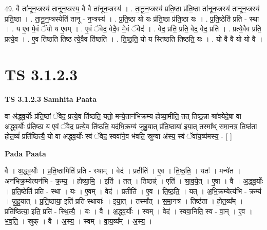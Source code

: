 \documentclass[17pt]{extarticle}
\begin{document}
49. वै ता॑नून॒प्त्रस्य॑ तानून॒प्त्रस्य॒ वै वै ता॑नून॒प्त्रस्य॑ । . ता॒नू॒न॒प्त्रस्य॑ प्रति॒ष्ठा प्र॑ति॒ष्ठा ता॑नून॒प्त्रस्य॑ तानून॒प्त्रस्य॑ प्रति॒ष्ठा । . ता॒नू॒न॒प्त्रस्येति॑ तानू - न॒प्त्रस्य॑ । . प्र॒ति॒ष्ठा यो यः प्र॑ति॒ष्ठा प्र॑ति॒ष्ठा यः । . प्र॒ति॒ष्ठेति॑ प्रति - स्था । . य ए॒व मे॒वं ॅयो य ए॒वम् । . ए॒वं ॅवेद॒ वेदै॒व मे॒वं ॅवेद॑ । . वेद॒ प्रति॒ प्रति॒ वेद॒ वेद॒ प्रति॑ । . प्रत्ये॒वैव प्रति॒ प्रत्ये॒व । . ए॒व ति॑ष्ठति तिष्ठ त्ये॒वैव ति॑ष्ठति । . ति॒ष्ठ॒ति॒ यो य स्ति॑ष्ठति तिष्ठति॒ यः । . यो वै वै यो यो वै । \newline
\pagebreak
{}

\section{ TS 3.1.2.3 }

\textbf{TS 3.1.2.3 } \newline
\textbf{Samhita Paata} \newline

वा अ॑द्ध्व॒र्योः प्र॑ति॒ष्ठां ॅवेद॒ प्रत्ये॒व ति॑ष्ठति॒ यतो॒ मन्ये॒तान॑भिक्रम्य होष्या॒मीति॒ तत् तिष्ठ॒न्ना श्रा॑वयेदे॒षा वा अ॑द्ध्व॒र्योः प्र॑ति॒ष्ठा य ए॒वं ॅवेद॒ प्रत्ये॒व ति॑ष्ठति॒ यद॑भि॒क्रम्य॑ जुहु॒यात् प्र॑ति॒ष्ठाया॑ इया॒त् तस्मा᳚थ् समा॒नत्र॒ तिष्ठ॑ता होत॒व्यं॑ प्रति॑ष्ठित्यै॒ यो वा अ॑द्ध्व॒र्योः स्वं ॅवेद॒ स्ववा॑ने॒व भ॑वति॒ स्रुग्वा अ॑स्य॒ स्वं ॅवा॑य॒व्य॑मस्य॒ - [  ] \newline

\textbf{Pada Paata} \newline

वै । अ॒द्ध्व॒र्योः । प्र॒ति॒ष्ठामिति॑ प्रति - स्थाम् । वेद॑ । प्रतीति॑ । ए॒व । ति॒ष्ठ॒ति॒ । यतः॑ । मन्ये॑त । अन॑भिक्र॒म्येत्यन॑भि - क्र॒म्य॒ । हो॒ष्या॒मि॒ । इति॑ । तत् । तिष्ठन्न्॑ । एति॑ । श्रा॒व॒ये॒त् । ए॒षा । वै । अ॒द्ध्व॒र्योः । प्र॒ति॒ष्ठेति॑ प्रति - स्था । यः । ए॒वम् । वेद॑ । प्रतीति॑ । ए॒व । ति॒ष्ठ॒ति॒ । यत् । अ॒भि॒क्रम्येत्य॑भि - क्रम्य॑ । जु॒हु॒यात् । प्र॒ति॒ष्ठाया॒ इति॑ प्रति-स्थायाः᳚ । इ॒या॒त् । तस्मा᳚त् । स॒मा॒नत्र॑ । तिष्ठ॑ता । हो॒त॒व्य᳚म् । प्रति॑ष्ठित्या॒ इति॒ प्रति॑ - स्थि॒त्यै॒ । यः । वै । अ॒द्ध्व॒र्योः । स्वम् । वेद॑ । स्ववा॒निति॒ स्व - वा॒न् । ए॒व । भ॒व॒ति॒ । स्रुक् । वै । अ॒स्य॒ । स्वम् । वा॒य॒व्य᳚म् । अ॒स्य॒ ।  \newline
\end{document}
